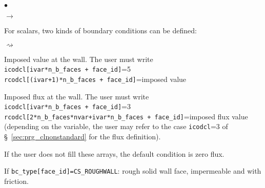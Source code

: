 \begin{list}{$\bullet$}{}
\begin{list}{$\rightarrow$}{}
\item For scalars, two kinds of boundary conditions can be
      defined:
\begin{list}{$\rightsquigarrow$}{}
\item Imposed value at the wall. The user must write\\
\hspace*{1cm}\texttt{icodcl[ivar*n\_b\_faces + face\_id]}=5\\
\hspace*{1cm}\texttt{rcodcl[(ivar+1)*n\_b\_faces + face\_id]}=imposed value\\
\item Imposed flux at the wall. The user must write\\
\hspace*{1cm}\texttt{icodcl[ivar*n\_b\_faces + face\_id]}=3\\
\hspace*{1cm}\texttt{rcodcl[2*n\_b\_faces*nvar+ivar*n\_b\_faces + face\_id]}=imposed flux value (depending on the
variable, the user may refer to the case \texttt{icodcl}=3 of \S~\ref{sec:prg_clnonstandard} for the flux definition).
\item If the user does not fill these arrays, the default condition
      is zero flux.
\end{list}
\end{list}

\item If \texttt{bc\_type[face\_id]=CS\_ROUGHWALL}: rough solid wall face, impermeable and with friction.


\end{list}
